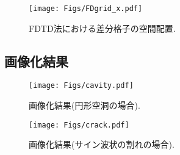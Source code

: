 \begin{figure}[h]
	\begin{center}
	\texttt{[image: Figs/FDgrid\_x.pdf]} 
	\end{center}
	\caption{FDTD法における差分格子の空間配置.} 
	\label{fig:staggered}
\end{figure}

\subsection{画像化結果}
\begin{figure}[h]
	\begin{center}
	\texttt{[image: Figs/cavity.pdf]} 
	\end{center}
	\caption{画像化結果(円形空洞の場合).} 
	\label{fig:cavity}
\end{figure}
\begin{figure}[h]
	\begin{center}
	\texttt{[image: Figs/crack.pdf]} 
	\end{center}
	\caption{画像化結果(サイン波状の割れの場合).} 
	\label{fig:crack}
\end{figure}
